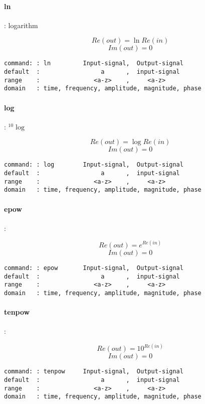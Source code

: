 \documentclass{report}
\newcommand{\bc}{\scriptsize}
\newcommand{\ec}{\normalsize}
\begin{document}
\paragraph{ln}: logarithm

\[ Re(out) = \ln{Re(in)} \]
\[ Im(out) = 0 \]

\bc
\begin{verbatim}
command: : ln         Input-signal,  Output-signal
default  :                 a      ,  input-signal 
range    :               <a-z>    ,     <a-z>
domain   : time, frequency, amplitude, magnitude, phase
\end{verbatim}
\ec

\paragraph{log}: $ ^{10}\log $

\[ Re(out) = \log{Re(in)} \]
\[ Im(out) = 0 \]

\bc
\begin{verbatim}
command: : log        Input-signal,  Output-signal
default  :                 a      ,  input-signal 
range    :               <a-z>    ,     <a-z>
domain   : time, frequency, amplitude, magnitude, phase
\end{verbatim}
\ec

\paragraph{epow}: 

\[ Re(out) = e^{Re(in)} \]
\[ Im(out) = 0 \]

\bc
\begin{verbatim}
command: : epow       Input-signal,  Output-signal
default  :                 a      ,  input-signal 
range    :               <a-z>    ,     <a-z>
domain   : time, frequency, amplitude, magnitude, phase
\end{verbatim}
\ec

\paragraph{tenpow}: 

\[ Re(out) = 10^{Re(in)} \]
\[ Im(out) = 0 \]

\bc
\begin{verbatim}
command: : tenpow     Input-signal,  Output-signal
default  :                 a      ,  input-signal 
range    :               <a-z>    ,     <a-z>
domain   : time, frequency, amplitude, magnitude, phase
\end{verbatim}
\ec
\end{document}
